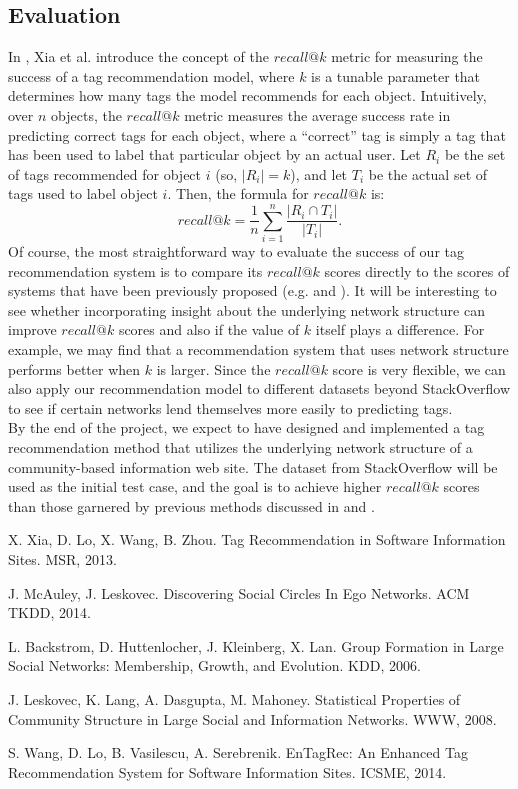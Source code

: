 \documentclass[11pt, final]{article}
\newcommand{\br}[1][.75]{\ \\[#1\baselineskip]}
\begin{document}
\subsection{Evaluation}

In \cite{1}, Xia et al. introduce the concept of the $recall@k$ metric for measuring the success of a tag recommendation model, where $k$ is a tunable parameter that determines how many tags the model recommends for each object. Intuitively, over $n$ objects, the $recall@k$ metric measures the average success rate in predicting correct tags for each object, where a ``correct'' tag is simply a tag that has been used to label that particular object by an actual user. Let $R_i$ be the set of tags recommended for object $i$ (so, $|R_i| = k$), and let $T_i$ be the actual set of tags used to label object $i$. Then, the formula for $recall@k$ is: \[recall@k = \frac{1}{n}\sum\limits_{i=1}^{n}\frac{|R_i \cap T_i|}{|T_i|}.\]
Of course, the most straightforward way to evaluate the success of our tag recommendation system is to compare its $recall@k$ scores directly to the scores of systems that have been previously proposed (e.g. \cite{1} and \cite{5}). It will be interesting to see whether incorporating insight about the underlying network structure can improve $recall@k$ scores and also if the value of $k$ itself plays a difference. For example, we may find that a recommendation system that uses network structure performs better when $k$ is larger. Since the $recall@k$ score is very flexible, we can also apply our recommendation model to different datasets beyond StackOverflow to see if certain networks lend themselves more easily to predicting tags.\br
By the end of the project, we expect to have designed and implemented a tag recommendation method that utilizes the underlying network structure of a community-based information web site. The dataset from StackOverflow will be used as the initial test case, and the goal is to achieve higher $recall@k$ scores than those garnered by previous methods discussed in \cite{1} and \cite{5}.

\begin{thebibliography}{1}
 X. Xia, D. Lo, X. Wang, B. Zhou. Tag Recommendation in Software Information Sites. MSR, 2013.

 J. McAuley, J. Leskovec. Discovering Social Circles In Ego Networks. ACM TKDD, 2014.

 L. Backstrom, D. Huttenlocher, J. Kleinberg, X. Lan. Group Formation in Large Social Networks: Membership, Growth, and Evolution. KDD, 2006.

 J. Leskovec, K. Lang, A. Dasgupta, M. Mahoney. Statistical Properties of Community Structure in Large Social and Information Networks. WWW, 2008.

 S. Wang, D. Lo, B. Vasilescu, A. Serebrenik. EnTagRec: An Enhanced Tag Recommendation System for Software Information Sites. ICSME, 2014.
\end{thebibliography}
\end{document}
